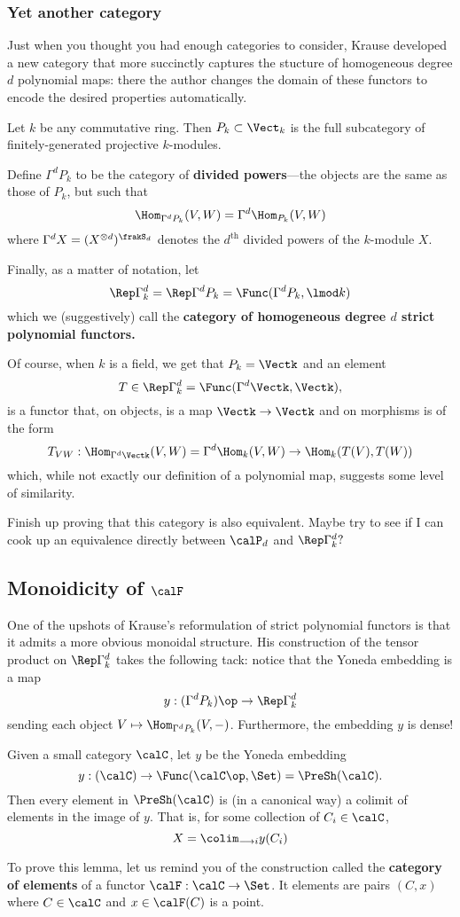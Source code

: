 \documentclass[12pt]{article}
\begin{document}
\subsubsection{Yet another category}
Just when you thought you had enough categories to consider, Krause developed a new category that more succinctly captures
the stucture of homogeneous degree $d$ polynomial maps: there the author changes the domain of these functors 
to encode the desired properties automatically.
\begin{defn}
	Let $k$ be any commutative ring. Then $P_k\subset \Vect_k$ is the full subcategory of finitely-generated projective $k$-modules.

	Define $\Gamma^d P_k$ to be the category of \textbf{divided powers}---the objects are the same as those of $P_k$, but such that 
	\[\Hom_{\Gamma^dP_k}(V,W)=\Gamma^d\Hom_{P_k}(V,W)\]
	where $\Gamma^d X=(X^{\otimes d})^{\frakS_d}$ denotes the \textbf{$d^{\text{th}}$} divided powers of the $k$-module $X$.

	Finally, as a matter of notation, let 
	\[\Rep\Gamma^d_k=\Rep\Gamma^dP_k=\Func(\Gamma^dP_k,\lmod k)\]
	which we (suggestively) call the \textbf{category of homogeneous degree $d$ strict polynomial functors.}
\end{defn}
\begin{rmk}
	Of course, when $k$ is a field, we get that $P_k=\Vectk$ and an element
	\[T\in\Rep\Gamma^d_k=\Func(\Gamma^d\Vectk,\Vectk),\]
	is a functor that, on objects, is a map $\Vectk\to \Vectk$ and on morphisms is of the form 
	\[T_{VW}:\Hom_{\Gamma^d\Vectk}(V,W)=\Gamma^d\Hom_k(V,W)\to \Hom_k(T(V),T(W))\]
	which, while not exactly our definition of a polynomial map, suggests some level of similarity.
\end{rmk}

{\color{red} Finish up proving that this category is also equivalent. Maybe try to see if I can cook up an equivalence directly between $\calP_d$ and $\Rep\Gamma^d_k?$}

\subsection{Monoidicity of \texorpdfstring{$\calF$}{F}}
One of the upshots of Krause's reformulation of strict polynomial functors is that it admits a more obvious monoidal 
structure. His construction of the tensor product on $\Rep\Gamma_k^d$ takes the following tack: notice that the Yoneda embedding 
is a map 
\[y:(\Gamma^dP_k)\op\to \Rep\Gamma^d_k\]
sending each object $V\mapsto \Hom_{\Gamma^dP_k}(V,-)$. Furthermore, the embedding $y$ is dense!
\begin{lem}\label{lem:yoneda-dense}
	Given a small category $\calC$, let $y$ be the Yoneda embedding 
	\[y:(\calC)\to \Func(\calC\op,\Set)=\PreSh(\calC).\]
	Then every element in $\PreSh(\calC)$ is (in a canonical way) a colimit of elements in the image of $y$. That is, for some collection of $C_i\in \calC$,
	\[X=\colim_{\longrightarrow i}y(C_i)\]
\end{lem}
To prove this lemma, let us remind you of the construction called the \textbf{category of elements} of a functor $\calF:\calC\to \Set$. It elements are 
pairs $(C,x)$ where $C\in\calC$ and $x\in \calF(C)$ is a point. 
\end{document}
